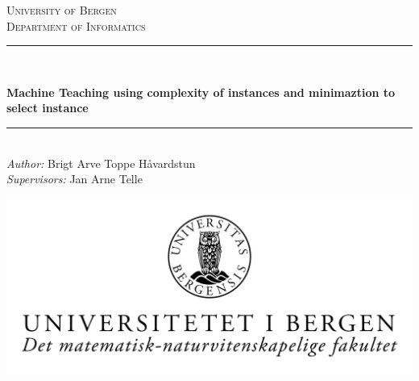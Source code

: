 \begin{titlepage}

\newcommand{\HRule}{\rule{\linewidth}{0.5mm}} %

\center %
 

\textsc{\LARGE University of Bergen \\ Department of Informatics}\\[1.5cm] %


\HRule \\[0.5cm]
\begin{Huge}
	\bfseries{Machine Teaching using complexity of instances and minimaztion to select instance}\\[0.7cm] %
\end{Huge}
\HRule \\[0.5cm]


\large \emph{Author:} Brigt Arve Toppe Håvardstun\\
\large \emph{Supervisors:} Jan Arne Telle\\[2cm]


\centerline{\includegraphics[scale=1.9]{figures/canvasWithFaculty}}


\end{titlepage}
